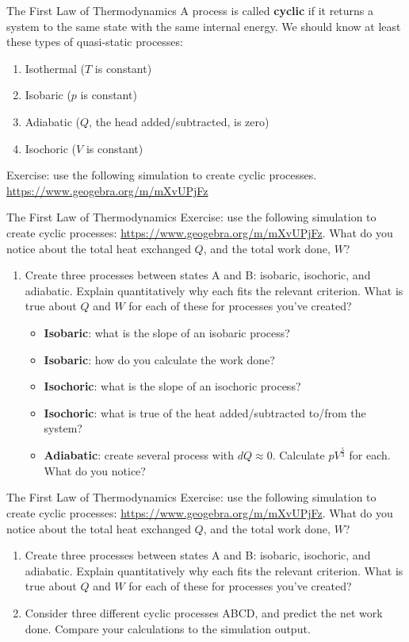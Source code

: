 \documentclass{beamer}
\begin{document}
\begin{frame}{The First Law of Thermodynamics}
A process is called \textbf{cyclic} if it returns a system to the same state with the same internal energy.
We should know at least these types of quasi-static processes: \small 
\begin{enumerate}
\item \alert{Isothermal} ($T$ is constant)
\item Isobaric ($p$ is constant)
\item Adiabatic ($Q$, the head added/subtracted, is zero)
\item Isochoric ($V$ is constant)
\end{enumerate}
Exercise: use the following simulation to create cyclic processes.
\url{https://www.geogebra.org/m/mXvUPjFz}
\end{frame}

\begin{frame}{The First Law of Thermodynamics}
\small
Exercise: use the following simulation to create cyclic processes: \url{https://www.geogebra.org/m/mXvUPjFz}.  What do you notice about the total heat exchanged $Q$, and the total work done, $W$?
\begin{enumerate}
\item Create three processes between states A and B: isobaric, isochoric, and adiabatic.  Explain quantitatively why each fits the relevant criterion.  What is true about $Q$ and $W$ for each of these for processes you've created?
\begin{itemize}
\item \textbf{Isobaric}: what is the slope of an isobaric process?
\item \textbf{Isobaric}: how do you calculate the work done?
\item \textbf{Isochoric}: what is the slope of an isochoric process?
\item \textbf{Isochoric}: what is true of the heat added/subtracted to/from the system?
\item \textbf{Adiabatic}: create several process with $dQ \approx 0$. Calculate $pV^{\frac{5}{3}}$ for each.  What do you notice?
\end{itemize}
\end{enumerate}
\end{frame}

\begin{frame}{The First Law of Thermodynamics}
\small
Exercise: use the following simulation to create cyclic processes: \url{https://www.geogebra.org/m/mXvUPjFz}.  What do you notice about the total heat exchanged $Q$, and the total work done, $W$?
\begin{enumerate}
\item Create three processes between states A and B: isobaric, isochoric, and adiabatic.  Explain quantitatively why each fits the relevant criterion.  What is true about $Q$ and $W$ for each of these for processes you've created?
\item \alert{Consider three different cyclic processes ABCD, and predict the net work done.  Compare your calculations to the simulation output.}
\end{enumerate}
\end{frame}
\end{document}
